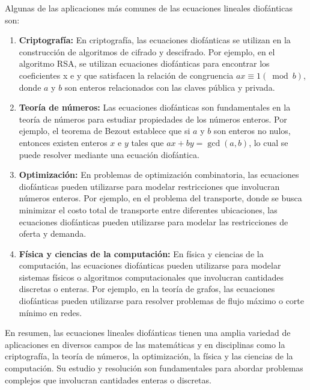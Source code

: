 Algunas de las aplicaciones más comunes de las ecuaciones lineales diofánticas son:

\begin{enumerate}
	\item \textbf{Criptografía:} En criptografía, las ecuaciones diofánticas se utilizan en la construcción de algoritmos de cifrado y descifrado. Por ejemplo, en el algoritmo RSA, se utilizan ecuaciones diofánticas para encontrar los coeficientes x e y que satisfacen la relación de congruencia $ax \equiv 1 (\bmod b)$, donde $a$ y $b$ son enteros relacionados con las claves pública y privada.
	\item \textbf{Teoría de números:} Las ecuaciones diofánticas son fundamentales en la teoría de números para estudiar propiedades de los números enteros. Por ejemplo, el teorema de Bezout establece que si $a$ y $b$ son enteros no nulos, entonces existen enteros $x$ e $y$ tales que $ax + by = \gcd(a, b)$, lo cual se puede resolver mediante una ecuación diofántica.
	\item \textbf{ Optimización:} En problemas de optimización combinatoria, las ecuaciones diofánticas pueden utilizarse para modelar restricciones que involucran números enteros. Por ejemplo, en el problema del transporte, donde se busca minimizar el costo total de transporte entre diferentes ubicaciones, las ecuaciones diofánticas pueden utilizarse para modelar las restricciones de oferta y demanda.
	\item  \textbf{Física y ciencias de la computación: }En física y ciencias de la computación, las ecuaciones diofánticas pueden utilizarse para modelar sistemas físicos o algoritmos computacionales que involucran cantidades discretas o enteras. Por ejemplo, en la teoría de grafos, las ecuaciones diofánticas pueden utilizarse para resolver problemas de flujo máximo o corte mínimo en redes.
\end{enumerate}

En resumen, las ecuaciones lineales diofánticas tienen una amplia variedad de aplicaciones en diversos campos de las matemáticas y en disciplinas como la criptografía, la teoría de números, la optimización, la física y las ciencias de la computación. Su estudio y resolución son fundamentales para abordar problemas complejos que involucran cantidades enteras o discretas.
